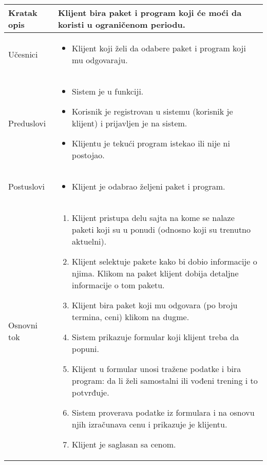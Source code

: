 \documentclass[../main.tex]{subfiles}
\begin{document}
\begin{longtable}{| p{} | p{} |} 

\hline
    Kratak opis & Klijent bira paket i program koji će moći da koristi u ograničenom periodu. \\ 
\hline    
    Učesnici & 
    	\begin{itemize}
        \item Klijent koji želi da odabere paket i program koji mu odgovaraju.
     \end{itemize}\\
\hline
   Preduslovi & \begin{itemize}
       \item Sistem je u funkciji.
       \item Korisnik je registrovan u sistemu (korisnik je klijent) i prijavljen je na sistem.
       \item Klijentu je tekući program istekao ili nije ni postojao.
   \end{itemize}\\
\hline  
    Postuslovi & \begin{itemize}
        \item Klijent je odabrao željeni paket i program.
    \end{itemize}\\
\hline
    Osnovni tok & \begin{enumerate}
        \item Klijent pristupa delu sajta na kome se nalaze paketi koji su u ponudi (odnosno koji su trenutno aktuelni).
        \item Klijent selektuje pakete kako bi dobio informacije o njima. Klikom na paket klijent dobija detaljne informacije o tom paketu.
        \item Klijent bira paket koji mu odgovara (po broju termina, ceni) klikom na dugme.
        \item Sistem prikazuje formular koji klijent treba da popuni.
        \item Klijent u formular unosi tražene podatke i bira program: da li želi samostalni ili vođeni trening i to potvrđuje.
        \item Sistem proverava podatke iz formulara i na osnovu njih izračunava cenu i prikazuje je klijentu.
        \item Klijent je saglasan sa cenom.

\end{enumerate}
\end{longtable}
\end{document}
